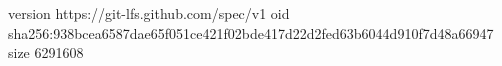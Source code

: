 version https://git-lfs.github.com/spec/v1
oid sha256:938bcea6587dae65f051ce421f02bde417d22d2fed63b6044d910f7d48a66947
size 6291608
